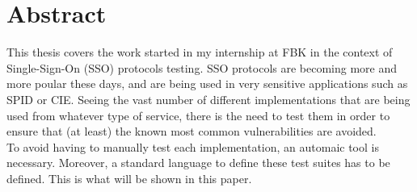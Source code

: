 \chapter*{Abstract} %

This thesis covers the work started in my internship at FBK in the context of Single-Sign-On (SSO) protocols testing.
SSO protocols are becoming more and more poular these days, and are being used in very sensitive applications such as SPID or CIE. Seeing the vast number of different implementations that are being used from whatever type of service, there is the need to test them in order to ensure that (at least) the known most common vulnerabilities are avoided.\\
To avoid having to manually test each implementation, an automaic tool is necessary. Moreover, a standard language to define these test suites has to be defined.
This is what will be shown in this paper.


